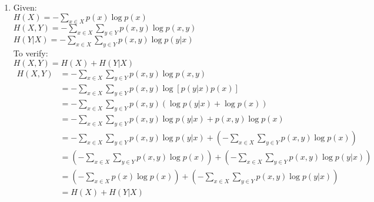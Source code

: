 \documentclass[fleqn,11pt]{article}
\begin{document}
\begin{enumerate}
\begin{tikzpicture}
\end{tikzpicture}
\item
Given: \\
$H(X) = \displaystyle -\sum_{x \in X} p(x) \log{p(x)}$\\
$H(X,Y) = \displaystyle -\sum_{x \in X} \sum_{y \in Y} p(x,y) \log{p(x,y)}$\\
$H(Y|X) = \displaystyle -\sum_{x \in X} \sum_{y \in Y} p(x,y) \log{p(y|x)}$\\
To verify:\\
$H(X,Y) = H(X) + H(Y|X)$
\begin{align*}
	H(X,Y) &= \displaystyle -\sum_{x \in X} \sum_{y \in Y} p(x,y) \log{p(x,y)} \\
			&= \displaystyle -\sum_{x \in X} \sum_{y \in Y} p(x,y) \log{[p(y|x)p(x)]}\\
			&= \displaystyle -\sum_{x \in X} \sum_{y \in Y} p(x,y) (\log{p(y|x)} + \log{p(x)})\\
			&= \displaystyle -\sum_{x \in X} \sum_{y \in Y} p(x,y)\log{p(y|x)} + p(x,y)\log{p(x)}\\
			&= \displaystyle -\sum_{x \in X} \sum_{y \in Y} p(x,y)\log{p(y|x)} + \left(-\sum_{x \in X} \sum_{y \in Y} p(x,y)\log{p(x)}\right)\\
			&= \displaystyle \left(-\sum_{x \in X} \sum_{y \in Y} p(x,y)\log{p(x)}\right) + \left(-\sum_{x \in X} \sum_{y \in Y} p(x,y)\log{p(y|x)}\right)\\
			&= \displaystyle \left(-\sum_{x \in X} p(x)\log{p(x)}\right) + \left(-\sum_{x \in X} \sum_{y \in Y} p(x,y)\log{p(y|x)}\right)\\
			&= H(X) + H(Y|X)
\end{align*}
\end{enumerate}
\end{document}
